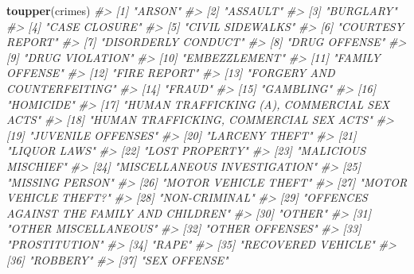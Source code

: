 \documentclass[
  12pt,
]{book}
\newenvironment{Shaded}{\begin{snugshade}}{\end{snugshade}}
\newcommand{\CommentTok}[1]{\textcolor[rgb]{0.37,0.37,0.37}{\textit{#1}}}
\newcommand{\KeywordTok}[1]{\textcolor[rgb]{0.27,0.27,0.27}{\textbf{#1}}}
\newcommand{\NormalTok}[1]{#1}
\begin{document}
\begin{Shaded}
\begin{Highlighting}[]
\KeywordTok{toupper}\NormalTok{(crimes)}
\CommentTok{\#>  [1] "ARSON"                                     }
\CommentTok{\#>  [2] "ASSAULT"                                   }
\CommentTok{\#>  [3] "BURGLARY"                                  }
\CommentTok{\#>  [4] "CASE CLOSURE"                              }
\CommentTok{\#>  [5] "CIVIL SIDEWALKS"                           }
\CommentTok{\#>  [6] "COURTESY REPORT"                           }
\CommentTok{\#>  [7] "DISORDERLY CONDUCT"                        }
\CommentTok{\#>  [8] "DRUG OFFENSE"                              }
\CommentTok{\#>  [9] "DRUG VIOLATION"                            }
\CommentTok{\#> [10] "EMBEZZLEMENT"                              }
\CommentTok{\#> [11] "FAMILY OFFENSE"                            }
\CommentTok{\#> [12] "FIRE REPORT"                               }
\CommentTok{\#> [13] "FORGERY AND COUNTERFEITING"                }
\CommentTok{\#> [14] "FRAUD"                                     }
\CommentTok{\#> [15] "GAMBLING"                                  }
\CommentTok{\#> [16] "HOMICIDE"                                  }
\CommentTok{\#> [17] "HUMAN TRAFFICKING (A), COMMERCIAL SEX ACTS"}
\CommentTok{\#> [18] "HUMAN TRAFFICKING, COMMERCIAL SEX ACTS"    }
\CommentTok{\#> [19] "JUVENILE OFFENSES"                         }
\CommentTok{\#> [20] "LARCENY THEFT"                             }
\CommentTok{\#> [21] "LIQUOR LAWS"                               }
\CommentTok{\#> [22] "LOST PROPERTY"                             }
\CommentTok{\#> [23] "MALICIOUS MISCHIEF"                        }
\CommentTok{\#> [24] "MISCELLANEOUS INVESTIGATION"               }
\CommentTok{\#> [25] "MISSING PERSON"                            }
\CommentTok{\#> [26] "MOTOR VEHICLE THEFT"                       }
\CommentTok{\#> [27] "MOTOR VEHICLE THEFT?"                      }
\CommentTok{\#> [28] "NON{-}CRIMINAL"                              }
\CommentTok{\#> [29] "OFFENCES AGAINST THE FAMILY AND CHILDREN"  }
\CommentTok{\#> [30] "OTHER"                                     }
\CommentTok{\#> [31] "OTHER MISCELLANEOUS"                       }
\CommentTok{\#> [32] "OTHER OFFENSES"                            }
\CommentTok{\#> [33] "PROSTITUTION"                              }
\CommentTok{\#> [34] "RAPE"                                      }
\CommentTok{\#> [35] "RECOVERED VEHICLE"                         }
\CommentTok{\#> [36] "ROBBERY"                                   }
\CommentTok{\#> [37] "SEX OFFENSE"                               }

\end{Highlighting}
\end{Shaded}
\end{document}
